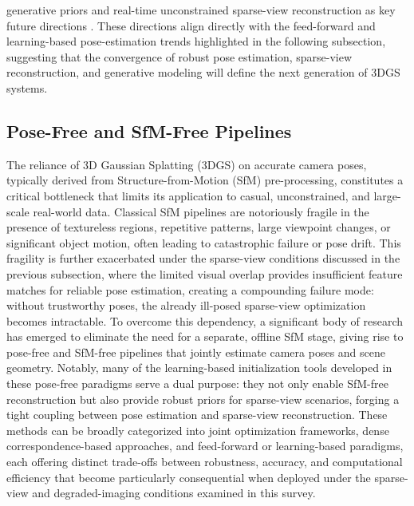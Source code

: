 \documentclass[11pt]{article}
\begin{document}
generative priors and real-time unconstrained sparse-view reconstruction as key future directions \cite{ref255}. These directions align directly with the feed-forward and learning-based pose-estimation trends highlighted in the following subsection, suggesting that the convergence of robust pose estimation, sparse-view reconstruction, and generative modeling will define the next generation of 3DGS systems.

\subsection{Pose-Free and SfM-Free Pipelines}

The reliance of 3D Gaussian Splatting (3DGS) on accurate camera poses, typically derived from Structure-from-Motion (SfM) pre-processing, constitutes a critical bottleneck that limits its application to casual, unconstrained, and large-scale real-world data. Classical SfM pipelines are notoriously fragile in the presence of textureless regions, repetitive patterns, large viewpoint changes, or significant object motion, often leading to catastrophic failure or pose drift. This fragility is further exacerbated under the sparse-view conditions discussed in the previous subsection, where the limited visual overlap provides insufficient feature matches for reliable pose estimation, creating a compounding failure mode: without trustworthy poses, the already ill-posed sparse-view optimization becomes intractable. To overcome this dependency, a significant body of research has emerged to eliminate the need for a separate, offline SfM stage, giving rise to pose-free and SfM-free pipelines that jointly estimate camera poses and scene geometry. Notably, many of the learning-based initialization tools developed in these pose-free paradigms serve a dual purpose: they not only enable SfM-free reconstruction but also provide robust priors for sparse-view scenarios, forging a tight coupling between pose estimation and sparse-view reconstruction. These methods can be broadly categorized into joint optimization frameworks, dense correspondence-based approaches, and feed-forward or learning-based paradigms, each offering distinct trade-offs between robustness, accuracy, and computational efficiency that become particularly consequential when deployed under the sparse-view and degraded-imaging conditions examined in this survey.
\end{document}
